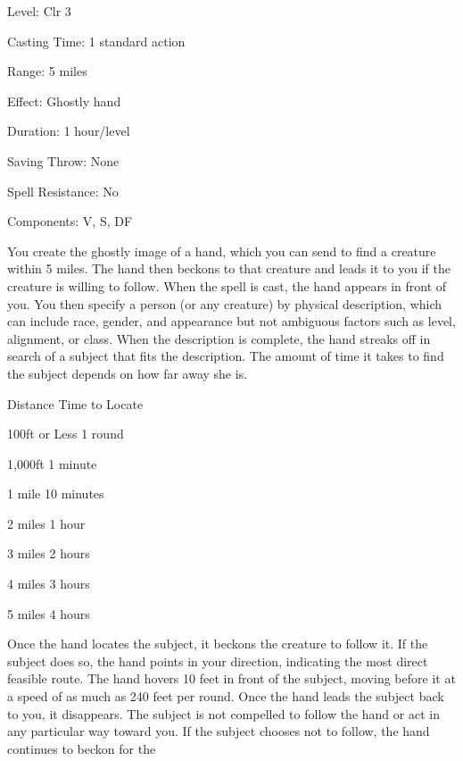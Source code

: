 
\begin{description*}
\item[Level:] Clr 3
\item[Casting Time:] 1 standard action
\item[Range:] 5 miles
\item[Effect:] Ghostly hand
\item[Duration:] 1 hour/level
\item[Saving Throw:] None
\item[Spell Resistance:] No
\item[Components:] V, S, DF
\end{description*}

You create the ghostly image of a hand, which you can send to find a creature within
5 miles. The hand then beckons to that creature and leads it to you if the creature
is willing to follow.
When the spell is cast, the hand appears in front of you. You then specify a person
(or any creature) by physical description, which can include race, gender, and
appearance but not ambiguous factors such as level, alignment, or class. When the
description is complete, the hand streaks off in search of a subject that fits
the description. The amount of time it takes to find the subject depends on how
far away she is.
\begin{description*}
\item[Distance] Time to Locate
\item[100ft or Less] 1 round
\item[1,000ft] 1 minute
\item[1 mile] 10 minutes
\item[2 miles] 1 hour
\item[3 miles] 2 hours
\item[4 miles] 3 hours
\item[5 miles] 4 hours
\end{description*}
Once the hand locates the subject, it beckons the creature to follow it. If the
subject does so, the hand points in your direction, indicating the most direct
feasible route. The hand hovers 10 feet in front of the subject, moving before
it at a speed of as much as 240 feet per round. Once the hand leads the subject
back to you, it disappears.
The subject is not compelled to follow the hand or act in any particular way toward
you. If the subject chooses not to follow, the hand continues to beckon for the
